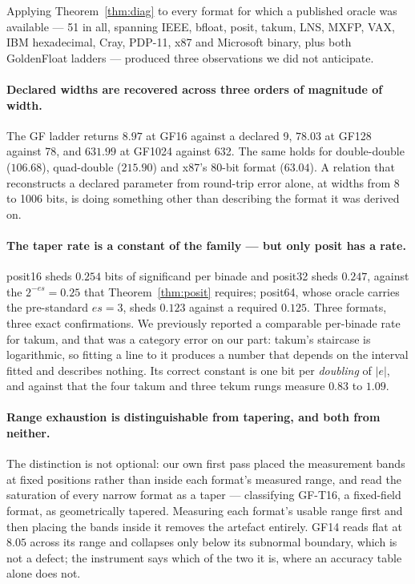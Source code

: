 \documentclass[11pt]{article}
\theoremstyle{definition}
\begin{document}
Applying Theorem~\ref{thm:diag} to every format for which a published oracle was
available --- 51 in all, spanning IEEE, bfloat, posit, takum, LNS, MXFP, VAX, IBM
hexadecimal, Cray, PDP-11, x87 and Microsoft binary, plus both GoldenFloat ladders
--- produced three observations we did not anticipate.

\paragraph{Declared widths are recovered across three orders of magnitude of
width.} The GF ladder returns $8.97$ at GF16 against a declared 9, $78.03$ at
GF128 against 78, and $631.99$ at GF1024 against 632. The same holds for
double-double ($106.68$), quad-double ($215.90$) and x87's 80-bit format
($63.04$). A relation that reconstructs a declared parameter from round-trip error
alone, at widths from 8 to 1006 bits, is doing something other than describing the
format it was derived on.

\paragraph{The taper rate is a constant of the family --- but only posit has a
rate.} posit16 sheds $0.254$ bits of significand per binade and posit32 sheds
$0.247$, against the $2^{-es} = 0.25$ that Theorem~\ref{thm:posit} requires;
posit64, whose oracle carries the pre-standard $es = 3$, sheds $0.123$ against a
required $0.125$. Three formats, three exact confirmations. We previously reported
a comparable per-binade rate for takum, and that was a category error on our part:
takum's staircase is logarithmic, so fitting a line to it produces a number that
depends on the interval fitted and describes nothing. Its correct constant is one
bit per \emph{doubling} of $|e|$, and against that the four takum and three tekum
rungs measure $0.83$ to $1.09$.

\paragraph{Range exhaustion is distinguishable from tapering, and both from
neither.} The distinction is not optional: our own first pass placed the
measurement bands at fixed positions rather than inside each format's measured
range, and read the saturation of every narrow format as a taper --- classifying
GF-T16, a fixed-field format, as geometrically tapered. Measuring each format's
usable range first and then placing the bands inside it removes the artefact
entirely. GF14 reads flat at $8.05$ across its range and collapses only below its
subnormal boundary, which is not a defect; the instrument says which of the two it
is, where an accuracy table alone does not.
\end{document}
